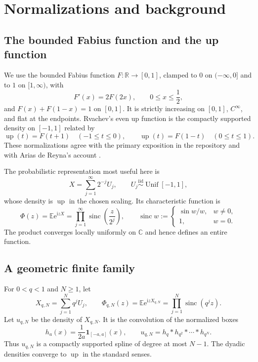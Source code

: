 \documentclass[11pt]{article}
\numberwithin{equation}{section}
\theoremstyle{definition}
\theoremstyle{remark}
\newcommand{\C}{\mathbb C}
\newcommand{\R}{\mathbb R}
\newcommand{\E}{\mathbb E}
\newcommand{\ii}{\mathrm i}
\newcommand{\e}{\mathrm e}
\newcommand{\sinc}{\operatorname{sinc}}
\newcommand{\upf}{\operatorname{up}}
\begin{document}
\section{Normalizations and background}
\label{sec:background}

\subsection{The bounded Fabius function and the up function}

We use the bounded Fabius function $F:\R\to[0,1]$, clamped to $0$ on
$(-\infty,0]$ and to $1$ on $[1,\infty)$, with
\begin{equation}
 F'(x)=2F(2x),\qquad 0\le x\le\frac12,
 \label{eq:fabius-diff}
\end{equation}
and $F(x)+F(1-x)=1$ on $[0,1]$.  It is strictly increasing on $[0,1]$,
$C^\infty$, and flat at the endpoints.  Rvachev's even up function is the
compactly supported density on $[-1,1]$ related by
\begin{equation}
  \upf(t)=F(t+1)\quad(-1\le t\le0),\qquad
  \upf(t)=F(1-t)\quad(0\le t\le1).
  \label{eq:F-up}
\end{equation}
These normalizations agree with the primary exposition in the repository and
with Arias de Reyna's account \cite{AriasDefinition,AriasArithmetic}.

The probabilistic representation most useful here is
\begin{equation}
 X=\sum_{j=1}^{\infty}2^{-j}U_j,
 \qquad U_j\stackrel{\mathrm{iid}}{\sim}\operatorname{Unif}[-1,1],
 \label{eq:rvachev-random-series}
\end{equation}
whose density is $\upf$ in the chosen scaling.  Its characteristic function is
\begin{equation}
 \Phi(z)=\E\e^{\ii zX}
 =\prod_{j=1}^{\infty}\sinc\!\left(\frac{z}{2^j}\right),
 \qquad \sinc w:=\begin{cases}\sin w/w,&w\ne0,\\1,&w=0.\end{cases}
 \label{eq:dyadic-infinite-product}
\end{equation}
The product converges locally uniformly on $\C$ and hence defines an entire
function.

\subsection{A geometric finite family}

For $0<q<1$ and $N\ge1$, let
\begin{equation}
 X_{q,N}=\sum_{j=1}^{N}q^jU_j,
 \qquad
 \Phi_{q,N}(z)=\E\e^{\ii zX_{q,N}}
 =\prod_{j=1}^{N}\sinc(q^jz).
 \label{eq:finite-product}
\end{equation}
Let $u_{q,N}$ be the density of $X_{q,N}$.  It is the convolution of the
normalized boxes
\begin{equation}
 h_a(x)=\frac{1}{2a}\bm 1_{[-a,a]}(x),\qquad
 u_{q,N}=h_q*h_{q^2}*\cdots*h_{q^N}.
 \label{eq:box-convolution}
\end{equation}
Thus $u_{q,N}$ is a compactly supported spline of degree at most $N-1$.
The dyadic densities converge to $\upf$ in the standard senses.
\end{document}
